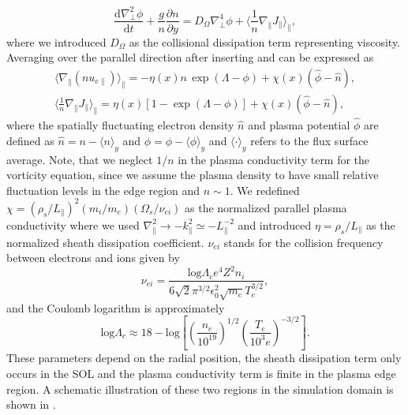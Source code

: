 \begin{equation}
	\frac{\mathrm{d}\nabla_\perp^2 \phi}{\mathrm{d}t} + \frac{g}{n}\frac{\partial n}{\partial y} = D_{\Omega}\nabla_\perp^4 \phi + \Bigg \langle \frac{1}{n} \nabla_\parallel J_{\parallel} \Bigg \rangle_\parallel,
\end{equation}
where we introduced $D_{\Omega}$  as the collisional dissipation term representing viscosity. Averaging over the parallel direction after inserting  and  can be expressed as
\begin{subequations}
	\begin{gather}
		\Bigg \langle \nabla_\parallel \left(n{u}_{e\parallel} \right) \Bigg \rangle_\parallel = - \eta(x) n\,\exp(\Lambda-\phi) + \chi(x)( \widehat{\phi} - \widehat{n} ) ,
		\\
		\Bigg \langle \frac{1}{n} \nabla_\parallel J_{\parallel} \Bigg \rangle_\parallel =  \eta(x) \left[ 1-\exp(\Lambda-\phi) \right] + \chi(x)( \widehat{\phi} - \widehat{n} ),
	\end{gather}
\end{subequations}
where the spatially fluctuating electron density $\widehat{n}$ and plasma potential $\widehat{\phi}$ are defined as $\widehat{n}=n-\langle{n}\rangle_y$ and $\widehat{\phi}=\phi-\langle{\phi}\rangle_y$ and $\langle{\cdot}\rangle_y$ refers to the flux surface average. Note, that we neglect $1/n$ in the plasma conductivity term for the vorticity equation, since we assume the plasma density to have small relative fluctuation levels in the edge region and $n \sim 1$. We redefined $\chi = \left(\rho_s/L_\parallel\right)^2(m_i/m_e)(\Omega_s/\nu_{ei})$ as the normalized parallel plasma conductivity where we used $\nabla_\parallel^2 \rightarrow -k^2_\parallel\simeq-L_\parallel^{-2}$ and introduced $\eta=\rho_s/L_\parallel$ as the normalized sheath dissipation coefficient. $\nu_{ei}$ stands for the collision frequency between electrons and ions given by
\begin{equation}
	\nu_{ei} = \frac{\textrm{log}\Lambda_c e^4Z^2n_i}{6\sqrt{2}\pi^{3/2} \epsilon_0^2\sqrt{m_e}T_e^{3/2}},
\end{equation}
and the Coulomb logarithm is approximately \cite{militellobook}
\begin{equation}
	\textrm{log}\Lambda_c\approx 18 - \textrm{log}\left[\left(\frac{n_e}{10^{19}}\right)^{1/2}\left(\frac{T_e}{10^3e}\right)^{-3/2}\right].
\end{equation}
These parameters depend on the radial position, the sheath dissipation term only occurs in the SOL and the plasma conductivity term is finite in the plasma edge region. A schematic illustration of these two regions in the simulation domain is shown in .

